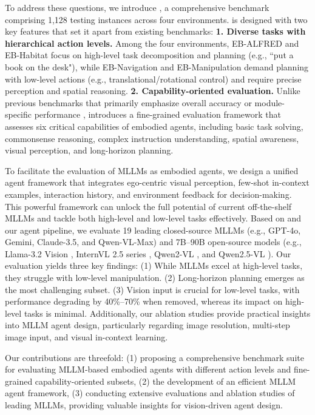 To address these questions, we introduce \name, a comprehensive benchmark comprising 1,128 testing instances across four environments. \name is designed with two key features that set it apart from existing benchmarks:
\textbf{1. Diverse tasks with hierarchical action levels.} Among the four environments, EB-ALFRED and EB-Habitat focus on high-level task decomposition and planning (e.g., ``put a book on the desk"), while EB-Navigation and EB-Manipulation demand planning with low-level actions (e.g., translational/rotational control) and require precise perception and spatial reasoning. 
\textbf{2. Capability-oriented evaluation.} Unlike previous benchmarks that primarily emphasize overall accuracy \cite{liu2023agentbench,choi2024lota,liu2024visualagentbench} or module-specific performance \cite{li2024embodied}, \name introduces a fine-grained evaluation framework that assesses six critical capabilities of embodied agents, including basic task solving, commonsense reasoning, complex instruction understanding, spatial awareness, visual perception, and long-horizon planning. 


To facilitate the evaluation of MLLMs as embodied agents, we design a unified agent framework that integrates ego-centric visual perception, few-shot in-context examples, interaction history, and environment feedback for decision-making. This powerful framework can unlock the full potential of current off-the-shelf MLLMs and tackle both high-level and low-level tasks effectively. Based on \name and our agent pipeline, we evaluate 19 leading closed-source MLLMs (e.g., GPT-4o, Gemini, Claude-3.5, and Qwen-VL-Max) and 7B–90B open-source models (e.g., Llama-3.2 Vision \cite{llama3.2}, InternVL 2.5 series \cite{internvl2.5,wang2024enhancing}, Qwen2-VL \cite{wang2024qwen2}, and Qwen2.5-VL \cite{bai2025qwen25vl}). Our evaluation yields three key findings: (1) While MLLMs excel at high-level tasks, they struggle with low-level manipulation. (2) Long-horizon planning emerges as the most challenging subset. (3) Vision input is crucial for low-level tasks, with performance degrading by 40\%–70\% when removed, whereas its impact on high-level tasks is minimal. Additionally, our ablation studies provide practical insights into MLLM agent design, particularly regarding image resolution, multi-step image input, and visual in-context learning.


Our contributions are threefold: (1) proposing a comprehensive benchmark suite for evaluating MLLM-based embodied agents with different action levels and fine-grained capability-oriented subsets, (2) the development of an efficient MLLM agent framework, (3) conducting extensive evaluations and ablation studies of leading MLLMs, providing valuable insights for vision-driven agent design. 





























